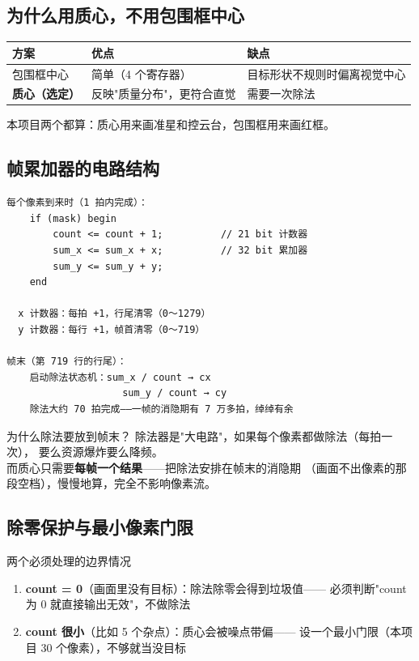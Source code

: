 \documentclass[11pt]{ctexart}
\begin{document}
\subsection{为什么用质心，不用包围框中心}

\begin{center}
\renewcommand{\arraystretch}{1.25}
\begin{tabular}{lll}
\toprule
\rowcolor{rowtint}\textbf{方案} & \textbf{优点} & \textbf{缺点} \\
\midrule
包围框中心 & 简单（4 个寄存器） & 目标形状不规则时偏离视觉中心 \\
\textbf{质心（选定）} & 反映"质量分布"，更符合直觉 & 需要一次除法 \\
\bottomrule
\end{tabular}
\end{center}

本项目两个都算：质心用来画准星和控云台，包围框用来画红框。

\subsection{帧累加器的电路结构}

\begin{Verbatim}[frame=single,fontsize=\small]
每个像素到来时（1 拍内完成）：
    if (mask) begin
        count <= count + 1;          // 21 bit 计数器
        sum_x <= sum_x + x;          // 32 bit 累加器
        sum_y <= sum_y + y;
    end

  x 计数器：每拍 +1，行尾清零（0～1279）
  y 计数器：每行 +1，帧首清零（0～719）

帧末（第 719 行的行尾）：
    启动除法状态机：sum_x / count → cx
                    sum_y / count → cy
    除法大约 70 拍完成——一帧的消隐期有 7 万多拍，绰绰有余
\end{Verbatim}

\begin{keybox}{为什么除法要放到帧末？}
除法器是"大电路"，如果每个像素都做除法（每拍一次），
要么资源爆炸要么降频。\\[4pt]
而质心只需要\textbf{每帧一个结果}——把除法安排在帧末的消隐期
（画面不出像素的那段空档），慢慢地算，完全不影响像素流。
\end{keybox}

\subsection{除零保护与最小像素门限}

\begin{warnbox}{两个必须处理的边界情况}
\begin{enumerate}
  \item \textbf{count = 0}（画面里没有目标）：除法除零会得到垃圾值——
        必须判断"count 为 0 就直接输出无效"，不做除法
  \item \textbf{count 很小}（比如 5 个杂点）：质心会被噪点带偏——
        设一个最小门限（本项目 30 个像素），不够就当没目标
\end{enumerate}
\end{warnbox}
\end{document}
